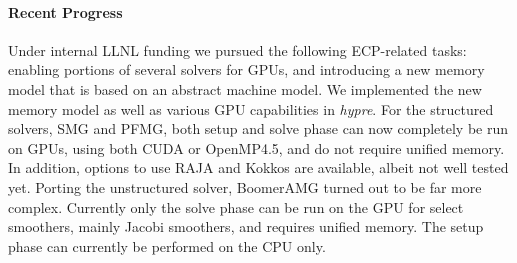 \paragraph{Recent Progress}

Under internal LLNL funding we pursued the following ECP-related tasks: enabling portions of several solvers for GPUs, and introducing a new memory model that is based on an abstract machine model.
We  implemented the new memory model as well as 
various GPU capabilities in {\sl hypre}. For the structured solvers, SMG and PFMG\cite{AsFa1996}, both setup and solve phase can now completely be run on GPUs, using both CUDA or OpenMP4.5, and do not require unified memory. In addition, options to use RAJA and Kokkos are available, albeit not well tested yet. 
Porting the unstructured solver, BoomerAMG turned out to be far more complex. Currently only the solve phase can be run on the GPU for select smoothers, mainly Jacobi smoothers, and requires unified memory. The setup phase can currently be performed on the CPU only.

